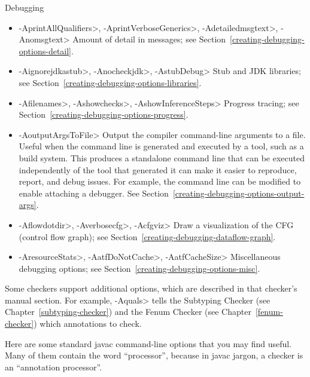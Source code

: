 Debugging
\begin{itemize}
\item
 \<-AprintAllQualifiers>,
 \<-AprintVerboseGenerics>,
 \<-Adetailedmsgtext>,
 \<-Anomsgtext>
Amount of detail in messages; see Section~\ref{creating-debugging-options-detail}.

\item
 \<-Aignorejdkastub>,
 \<-Anocheckjdk>,
 \<-AstubDebug>
Stub and JDK libraries; see Section~\ref{creating-debugging-options-libraries}.

\item
 \<-Afilenames>,
 \<-Ashowchecks>,
 \<-AshowInferenceSteps>
Progress tracing; see Section~\ref{creating-debugging-options-progress}.

\item
\<-AoutputArgsToFile>
Output the compiler command-line arguments to a file.  Useful when the
command line is generated and executed by a tool, such as a build system.
This produces a standalone command line that can be executed independently
of the tool that generated it can make it easier to reproduce, report, and
debug issues.  For example, the command line can be modified to enable
attaching a debugger.
See Section~\ref{creating-debugging-options-output-args}.

\item
 \<-Aflowdotdir>,
 \<-Averbosecfg>,
 \<-Acfgviz>
 Draw a visualization of the CFG (control flow graph); see
 Section~\ref{creating-debugging-dataflow-graph}.

\item
 \<-AresourceStats>,
 \<-AatfDoNotCache>,
 \<-AatfCacheSize>
Miscellaneous debugging options; see Section~\ref{creating-debugging-options-misc}.

\end{itemize}


\noindent
Some checkers support additional options, which are described in that
checker's manual section.
For example, \<-Aquals> tells
the Subtyping Checker (see Chapter~\ref{subtyping-checker}) and the Fenum Checker
(see Chapter~\ref{fenum-checker}) which annotations to check.


Here are some standard javac command-line options that you may find useful.
Many of them contain the word ``processor'', because in javac jargon, a
checker is an ``annotation processor''.

